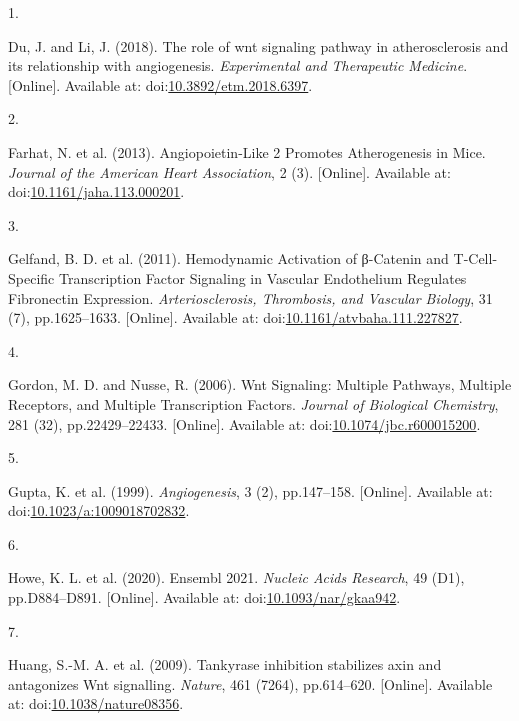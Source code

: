 \documentclass[
  11pt,
]{article}
\newlength{\cslhangindent}
\newlength{\csllabelwidth}
\newlength{\cslentryspacingunit} %
\newenvironment{CSLReferences}[2] %
 {%
  \setlength{\parindent}{0pt}
  \ifodd #1
  \let\oldpar\par
  \def\par{\hangindent=\cslhangindent\oldpar}
  \fi
  \setlength{\parskip}{#2\cslentryspacingunit}
 }%
 {}
\newcommand{\CSLLeftMargin}[1]{\parbox[t]{\csllabelwidth}{#1}}
\newcommand{\CSLRightInline}[1]{\parbox[t]{\linewidth - \csllabelwidth}{#1}\break}
\begin{document}
\hypertarget{refs}{}
\begin{CSLReferences}{0}{0}
\leavevmode{}%
\CSLLeftMargin{1. }
\CSLRightInline{Du, J. and Li, J. (2018). {The role of wnt signaling pathway in atherosclerosis and its relationship with angiogenesis}. \emph{Experimental and Therapeutic Medicine}. {[}Online{]}. Available at: doi:\href{https://doi.org/10.3892/etm.2018.6397}{10.3892/etm.2018.6397}.}

\leavevmode{}%
\CSLLeftMargin{2. }
\CSLRightInline{Farhat, N. {et al.} (2013). {Angiopoietin{-}Like 2 Promotes Atherogenesis in Mice}. \emph{Journal of the American Heart Association}, 2 (3). {[}Online{]}. Available at: doi:\href{https://doi.org/10.1161/jaha.113.000201}{10.1161/jaha.113.000201}.}

\leavevmode{}%
\CSLLeftMargin{3. }
\CSLRightInline{Gelfand, B. D. {et al.} (2011). {Hemodynamic Activation of β-Catenin and T-Cell-Specific Transcription Factor Signaling in Vascular Endothelium Regulates Fibronectin Expression}. \emph{Arteriosclerosis, Thrombosis, and Vascular Biology}, 31 (7), pp.1625--1633. {[}Online{]}. Available at: doi:\href{https://doi.org/10.1161/atvbaha.111.227827}{10.1161/atvbaha.111.227827}.}

\leavevmode{}%
\CSLLeftMargin{4. }
\CSLRightInline{Gordon, M. D. and Nusse, R. (2006). {Wnt Signaling: Multiple Pathways, Multiple Receptors, and Multiple Transcription Factors}. \emph{Journal of Biological Chemistry}, 281 (32), pp.22429--22433. {[}Online{]}. Available at: doi:\href{https://doi.org/10.1074/jbc.r600015200}{10.1074/jbc.r600015200}.}

\leavevmode{}%
\CSLLeftMargin{5. }
\CSLRightInline{Gupta, K. {et al.} (1999). \emph{Angiogenesis}, 3 (2), pp.147--158. {[}Online{]}. Available at: doi:\href{https://doi.org/10.1023/a:1009018702832}{10.1023/a:1009018702832}.}

\leavevmode{}%
\CSLLeftMargin{6. }
\CSLRightInline{Howe, K. L. {et al.} (2020). {Ensembl 2021}. \emph{Nucleic Acids Research}, 49 (D1), pp.D884--D891. {[}Online{]}. Available at: doi:\href{https://doi.org/10.1093/nar/gkaa942}{10.1093/nar/gkaa942}.}

\leavevmode{}%
\CSLLeftMargin{7. }
\CSLRightInline{Huang, S.-M. A. {et al.} (2009). {Tankyrase inhibition stabilizes axin and antagonizes Wnt signalling}. \emph{Nature}, 461 (7264), pp.614--620. {[}Online{]}. Available at: doi:\href{https://doi.org/10.1038/nature08356}{10.1038/nature08356}.}


\end{CSLReferences}
\end{document}
